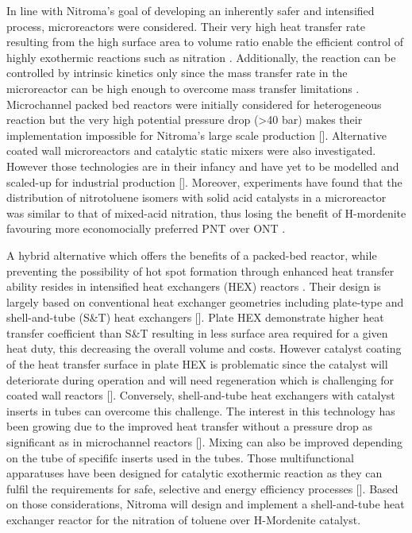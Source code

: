 In line with Nitroma's goal of developing an inherently safer and intensified process, microreactors were considered. Their very high heat transfer rate resulting from the high surface area to volume ratio enable the efficient control of highly exothermic reactions such as nitration \cite{halder_nitration_2007}. Additionally, the reaction can be controlled by intrinsic kinetics only since the mass transfer rate in the microreactor can be high enough to overcome mass transfer limitations \cite{halder_nitration_2007}. Microchannel packed bed reactors were initially considered for heterogeneous reaction but the very high potential pressure drop (>40 bar) makes their implementation impossible for Nitroma's large scale production []. Alternative coated wall microreactors and catalytic static mixers were also investigated. However those technologies are in their infancy and have yet to be modelled and scaled-up for industrial production []. Moreover, experiments have found that the distribution of nitrotoluene isomers with solid acid catalysts in a microreactor was similar to that of mixed-acid nitration, thus losing the benefit of H-mordenite favouring more economocially preferred PNT over ONT \cite{halder_nitration_2007}.


A hybrid alternative which offers the benefits of a packed-bed reactor, while preventing the possibility of hot spot formation through enhanced heat transfer ability resides in intensified  heat exchangers (HEX) reactors \cite{di_miceli_raimondi_safety_2015}. Their design is largely based on conventional heat exchanger geometries including plate-type and shell-and-tube (S\&T) heat exchangers []. Plate HEX demonstrate higher heat transfer coefficient than S\&T resulting in less surface area required for a given heat duty, this decreasing the overall volume and costs. However catalyst coating of the heat transfer surface in plate HEX is problematic since the catalyst will deteriorate during operation and will need regeneration which is challenging for coated wall reactors []. Conversely, shell-and-tube heat exchangers with catalyst inserts in tubes can overcome this challenge. The interest in this technology has been growing due to the improved heat transfer without a pressure drop as significant as in microchannel reactors []. Mixing can also be improved depending on the tube of specififc inserts used in the tubes. Those multifunctional apparatuses have been designed for catalytic exothermic reaction as they can fulfil the requirements for safe, selective and energy efficiency processes []. Based on those considerations, Nitroma will design and implement a shell-and-tube heat exchanger reactor for the nitration of toluene over H-Mordenite catalyst.



